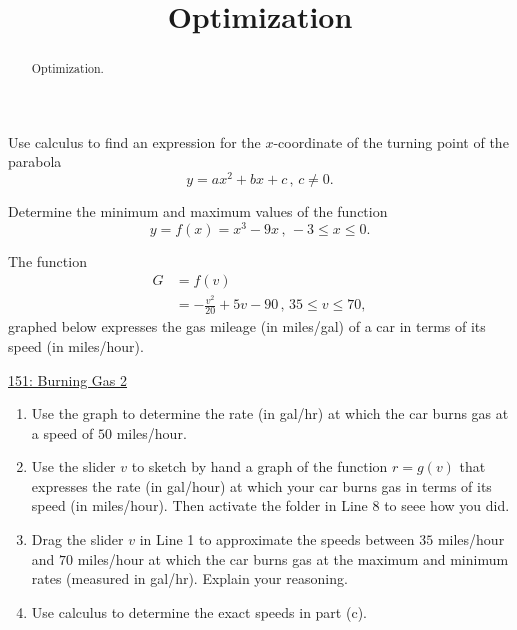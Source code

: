 \documentclass{ximera}
\title{Optimization}
\begin{document}
\begin{abstract}
Optimization.
\end{abstract}
\maketitle


\begin{question} \label{QOepREPER}
Use calculus to find an expression for the $x$-coordinate of the turning point of the parabola
\[
    y = ax^2 + bx + c \, , \, c\neq 0.
\]
\end{question}

\begin{question} \label{Q545hhghnnggZ}
Determine the minimum and maximum values of the function
\[
     y = f(x) = x^3 - 9x \, , \, -3\leq x \leq 0 .
\]
\end{question}

\begin{question} \label{Q5hdfhgeyghhg}
The function
\begin{align*}
    G  &= f(v)    \\
         &=  -\frac{v^2}{20} + 5v -90 \, , \, 35\leq v \leq 70 ,
\end{align*}
graphed below expresses the gas mileage (in miles/gal) of a car in terms of its speed (in miles/hour).

\begin{onlineOnly}
    \begin{center}
\end{center}
\end{onlineOnly}

\href{https://www.desmos.com/calculator/bcj0k1fymu}{151: Burning Gas 2}

\begin{enumerate}
\item Use the graph to determine the rate (in gal/hr) at which the car burns gas at a speed of $50$ miles/hour.

\item Use the slider $v$ to sketch by hand a graph of the function $r=g(v)$ that expresses the rate (in gal/hour) at which your car burns gas in terms of its speed (in miles/hour). Then activate the folder in Line 8 to seee how you did.

\item Drag the slider $v$ in Line 1 to approximate the speeds between $35$ miles/hour and $70$ miles/hour at which the car burns gas at the maximum and minimum rates (measured in gal/hr). Explain your reasoning.

\item Use calculus to determine the exact speeds in part (c). %

\end{enumerate}
\end{question}
\end{document}
